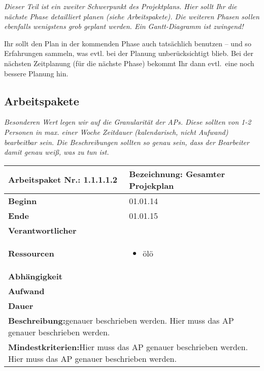 \documentclass[fontsize=12pt,paper=a4,twoside]{scrartcl}
\begin{document}
{\em Dieser Teil ist ein zweiter Schwerpunkt des Projektplans. Hier sollt Ihr die nächste Phase detailliert planen (siehe Arbeitspakete). Die weiteren Phasen sollen ebenfalls wenigstens grob geplant werden. Ein Gantt-Diagramm ist zwingend! 

Ihr sollt den Plan in der kommenden Phase auch tatsächlich benutzen -- und so
  Erfahrungen sammeln, was evtl. bei der Planung unberücksichtigt
  blieb. Bei der nächsten Zeitplanung (für die nächste Phase) bekommt
  Ihr dann evtl.\ eine noch bessere Planung hin.}

\subsection{Arbeitspakete}\label{aps}


{\em Besonderen Wert legen wir auf die Granularität der APs. Diese
  sollten von 1-2 Personen in max. einer Woche Zeitdauer (kalendarisch, nicht
  Aufwand) bearbeitbar sein. Die Beschreibungen sollten so genau sein,
  dass der Bearbeiter damit genau weiß, was zu tun ist.}
  

\begin{tabular}{|p{5.3cm}|p{9.7cm}|}\hline
   \textbf{Arbeitspaket Nr.:} 1.1.1.1.2 & \textbf{Bezeichnung:} Gesamter Projekplan\\ \hline \hline
   \textbf{Beginn} & 01.01.14\\ \hline
   \textbf{Ende} & 01.01.15\\ \hline
   \textbf{Verantwortlicher} & \\ \hline
   \textbf{Ressourcen} & \begin{itemize}
   \item ölö
 
\end{itemize}    \\ \hline
\textbf{Abhängigkeit} &\\ \hline
 \textbf{Aufwand} & \\ \hline
 \textbf{Dauer} & \\ \hline
   \multicolumn{2}{|p{15cm}|}{\textbf{Beschreibung:}\newline   genauer beschrieben werden. Hier muss das AP genauer beschrieben werden. }\\ \hline
    \multicolumn{2}{|p{15cm}|}{\textbf{Mindestkriterien:}\newline  Hier muss das AP genauer beschrieben werden. Hier muss das AP genauer beschrieben werden. }\\ \hline
 \end{tabular}
 
\end{document}
